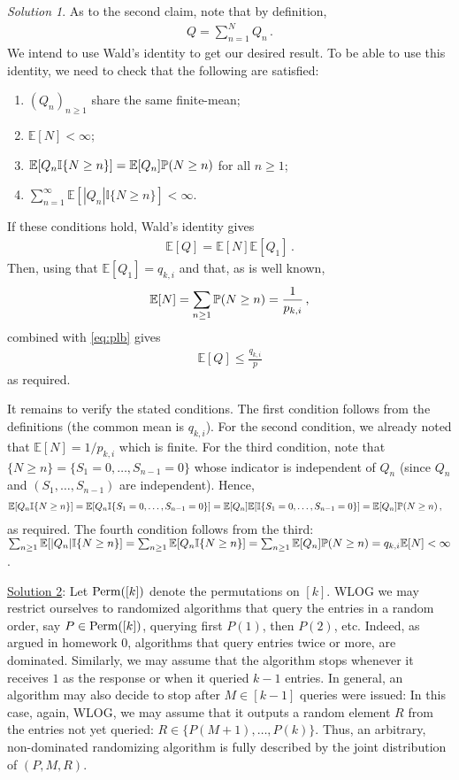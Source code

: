 \documentclass{article}
\DeclareMathOperator*{\1}{\mathbbm{1}}
\newcommand{\E}{\mathbb E}
\newcommand{\EE}[1]{\E[#1]}
\newcommand{\0}{\mathbf{0}}
\newcommand{\one}[1]{\mathbb{I}\{#1\}}
\theoremstyle{definition}
\theoremstyle{remark}
\newtheorem*{solution*}{Solution}
\theoremstyle{theorem}
\begin{document}
\begin{solution*}
As to the second claim, note that by definition,
\begin{align*}
Q = \sum_{n=1}^N Q_n\,.
\end{align*}
We intend to use Wald's identity to get our desired result.
To be able to use this identity, we need to check that the following are satisfied:
\begin{enumerate}
\item $(Q_n)_{n\ge 1}$ share the same finite-mean;
\item $\E[N]<\infty$;
\item $\E[ Q_n \one{N\ge n} ] = \E[Q_n] \PP(N\ge n)$ for all $n\ge 1$;
\item $\sum_{n=1}^\infty \E[ |Q_n| \one{ N \ge n } ]<\infty$.
\end{enumerate}
If these conditions hold, Wald's identity gives
\begin{align*}
\E[Q] = \E[N] \E[Q_1]\,.
\end{align*}
Then, using that $\E[Q_1] = q_{k,i}$
and that, as is well known,
\begin{align}
\E[N] = \sum_{n\ge 1} \PP(N\ge n)=\frac{1}{p_{k,i}}\,,
\label{eq:nex}
\end{align}
combined with \eqref{eq:plb} gives
\begin{align*}
\E[Q] \le \frac{q_{k,i}}{p}
\end{align*}
as required.

It remains to verify the stated conditions.
The first condition follows from the definitions (the common mean is $q_{k,i}$).
For the second condition, we already noted that $\E[N]=1/p_{k,i}$ which is finite.
For the third condition, note that $\{N\ge n \} = \{S_1=0,\dots,S_{n-1}=0\}$ whose indicator is independent of $Q_n$ (since $Q_n$ and $(S_1,\dots,S_{n-1})$ are independent). Hence,
\begin{align*}
\E[ Q_n \one{N\ge n} ]
& = \E[ Q_n \one{S_1=0,\dots,S_{n-1}=0} ]
    = \E[ Q_n ]  \E[ \one{S_1=0,\dots,S_{n-1}=0}  ]
= \E[Q_n] \PP(N\ge n)\,,
\end{align*}
as required.
The fourth condition follows from the third:
$\sum_{n\ge 1} \E[ |Q_n|\one{N\ge n}] = \sum_{n\ge 1} \E[ Q_n \one{N\ge n }]
= \sum_{n\ge 1} \E[Q_n] \PP(N\ge n) = q_{k,i}\EE{N}<\infty$.

\bigskip
\bigskip
\noindent \underline{Solution 2}:
Let $\mathrm{Perm}([k])$ denote the permutations on $[k]$.
WLOG we may restrict ourselves to randomized algorithms
that query the entries in a random order, say $P\in \mathrm{Perm}([k])$, querying first $P(1)$, then $P(2)$, etc.
Indeed, as argued in homework 0, algorithms that query entries twice or more, are dominated.
Similarly, we may assume that the algorithm stops whenever it receives $1$ as the response
or when it queried $k-1$ entries.
In general, an algorithm may also decide to stop after $M\in [k-1]$ queries were issued:
In this case, again, WLOG, we may assume
that it outputs a random element $R$ from the entries not yet queried:
$R\in \{ P(M+1),\dots,P(k)\}$.
Thus, an arbitrary, non-dominated randomizing algorithm is fully described by the joint distribution of $(P,M,R)$.


\end{solution*}
\end{document}
